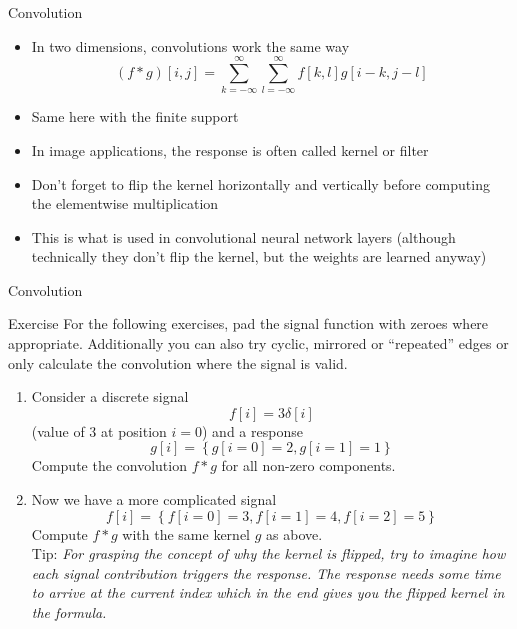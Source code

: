   \begin{frame}{Convolution}
    \begin{itemize}
      \item In two dimensions, convolutions work the same way
        \begin{equation*}
          (f*g)[i, j] =
          \sum_{k=-\infty}^{\infty} \sum_{l=-\infty}^{\infty} f[k,l]g[i-k, j-l]
        \end{equation*}
      \item Same here with the finite support
      \item In image applications, the response is often called kernel or filter
      \item Don't forget to flip the kernel horizontally and vertically before
        computing the elementwise multiplication
      \item This is what is used in convolutional neural network layers (although
        technically they don't flip the kernel, but the weights are learned anyway)
    \end{itemize}
  \end{frame}

  \begin{frame}{Convolution}
    \begin{exampleblock}{Exercise}
    For the following exercises, pad the signal function with zeroes where
    appropriate. Additionally you can also try cyclic, mirrored or \enquote{repeated}
    edges or only calculate the convolution where the signal is valid.
      \begin{enumerate}
        \item Consider a discrete signal
          \begin{equation*}
            f[i] = 3\delta[i]
          \end{equation*}
          (value of $3$ at position $i=0$) and a response
          \begin{equation*}
            g[i] = \left\{g[i=0] = 2, g[i=1] = 1\right\}
          \end{equation*}
          Compute the convolution $f*g$ for all non-zero components.
        \item Now we have a more complicated signal
          \begin{equation*}
            f[i] = \left\{f[i=0] = 3, f[i=1] = 4, f[i=2] = 5\right\}
          \end{equation*}
          Compute $f*g$ with the same kernel $g$ as above. \\
          Tip: \emph{For grasping the concept of why the kernel is flipped, try
          to imagine how each signal contribution triggers the response. The
          response needs some time to arrive at the current index which in the
          end gives you the flipped kernel in the formula.}
      \end{enumerate}
    \end{exampleblock}
  \end{frame}

